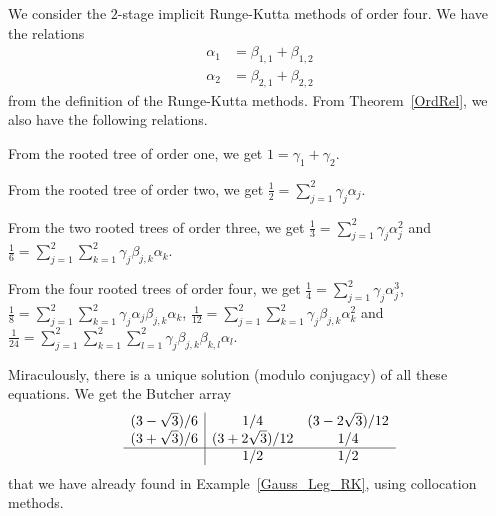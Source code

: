 \begin{egg}
We consider the $2$-stage implicit Runge-Kutta methods of order four.
We have the relations
\begin{align*}
\alpha_1 &= \beta_{1,1} + \beta_{1,2} \\
\alpha_2 &= \beta_{2,1} + \beta_{2,2}
\end{align*}
from the definition of the Runge-Kutta methods.  From
Theorem~\ref{OrdRel}, we also have the following relations.

From the rooted tree of order one, we get $1 = \gamma_1 + \gamma_2$.

From the rooted tree of order two, we get
$\displaystyle \frac{1}{2} = \sum_{j=1}^2 \gamma_j \alpha_j$.

From the two rooted trees of order three, we get
$\displaystyle \frac{1}{3} = \sum_{j=1}^2 \gamma_j \alpha_j^2$
and
$\displaystyle \frac{1}{6}
= \sum_{j=1}^2 \sum_{k=1}^2 \gamma_j\beta_{j,k} \alpha_k$.

From the four rooted trees of order four, we get
$\displaystyle \frac{1}{4} = \sum_{j=1}^2 \gamma_j \alpha_j^3$,
$\displaystyle \frac{1}{8}
= \sum_{j=1}^2 \sum_{k=1}^2 \gamma_j\alpha_j\beta_{j,k} \alpha_k$,
$\displaystyle \frac{1}{12}
= \sum_{j=1}^2 \sum_{k=1}^2 \gamma_j\beta_{j,k} \alpha_k^2$ and
$\displaystyle \frac{1}{24}
= \sum_{j=1}^2 \sum_{k=1}^2 \sum_{l=1}^2 \gamma_j\beta_{j,k} \beta_{k,l}\alpha_l$.

Miraculously, there is a unique solution (modulo conjugacy) of all
these equations.  We get the Butcher array
\[
\begin{array}{c|cc}
(3-\sqrt{3})/6 & 1/4 & (3-2 \sqrt{3})/12 \\
(3 + \sqrt{3})/6 & (3 + 2\sqrt{3})/12 & 1/4 \\
\hline
 & 1/2 & 1/2
\end{array}
\]
that we have already found in Example~\ref{Gauss_Leg_RK}, using
collocation methods.
\label{Gauss_Leg_RKcontinued}
\end{egg}

